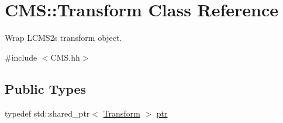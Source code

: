 \hypertarget{class_c_m_s_1_1_transform}{}\section{C\+MS\+:\+:Transform Class Reference}
\label{class_c_m_s_1_1_transform}


Wrap L\+C\+M\+S2\textquotesingle{}s transform object.  




{\ttfamily \#include $<$C\+M\+S.\+hh$>$}

\subsection*{Public Types}
\begin{DoxyCompactItemize}
\item 
typedef std\+::shared\+\_\+ptr$<$ \hyperlink{class_c_m_s_1_1_transform}{Transform} $>$ \hyperlink{class_c_m_s_1_1_transform_ac0fcc21ddc52273f9ce95dba97ef1116}{ptr}
\end{DoxyCompactItemize}

